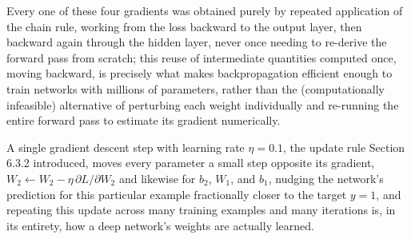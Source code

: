 \documentclass[../ai_in_finance]{subfiles}
\begin{document}
Every one of these four gradients was obtained purely by repeated application of the chain rule, working from the loss backward to the output layer, then backward again through the hidden layer, never once needing to re-derive the forward pass from scratch; this reuse of intermediate quantities computed once, moving backward, is precisely what makes backpropagation efficient enough to train networks with millions of parameters, rather than the (computationally infeasible) alternative of perturbing each weight individually and re-running the entire forward pass to estimate its gradient numerically.

A single gradient descent step with learning rate $\eta=0.1$, the update rule Section 6.3.2 introduced, moves every parameter a small step opposite its gradient, $W_2 \leftarrow W_2 - \eta\,\partial L/\partial W_2$ and likewise for $b_2$, $W_1$, and $b_1$, nudging the network's prediction for this particular example fractionally closer to the target $y=1$, and repeating this update across many training examples and many iterations is, in its entirety, how a deep network's weights are actually learned.
\end{document}
